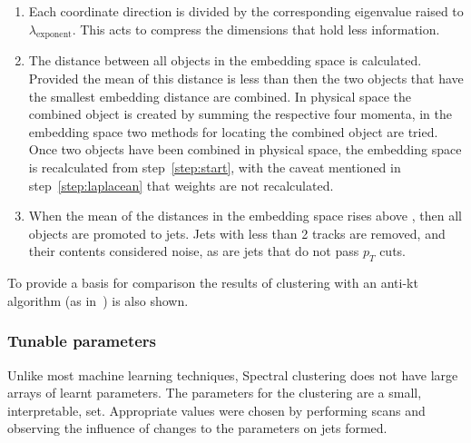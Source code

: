 \begin{enumerate}
    \item \label{step:compression} Each coordinate direction is divided by the corresponding eigenvalue raised to \(\lambda_\text{exponent}\).
            This acts to compress the dimensions that hold less information.

        \item \label{step:stoppingcondition} The distance between all objects in the embedding space is calculated.
            Provided the mean of this distance is less than \stoppingdeltar{} then
        the two objects that have the smallest embedding distance are combined.
        In physical space the combined object is created by summing the respective four momenta,
        in the embedding space two methods for locating the combined object are tried.
        Once two objects have been combined in physical space, the embedding space is recalculated from step~\ref{step:start},
        with the caveat mentioned in step~\ref{step:laplacean} that weights are not recalculated.


    \item When the mean of the distances in the embedding space rises above \stoppingdeltar{},
        then all objects are promoted to jets. Jets with less than 2 tracks are removed,
        and their contents considered noise,
        as are jets that do not pass \(p_T\) cuts.
    \end{enumerate}
    To provide a basis for comparison the results of clustering with an anti-kt algorithm (as in~\cite{Cacciari2008akt}) is also shown.

\subsubsection{Tunable parameters}\label{sec:spectralmethodparam}
Unlike most machine learning techniques, Spectral clustering does not have large arrays of learnt parameters.
The parameters for the clustering are a small, interpretable, set.
Appropriate values were chosen by performing scans and observing the influence of changes to the parameters on jets formed.

